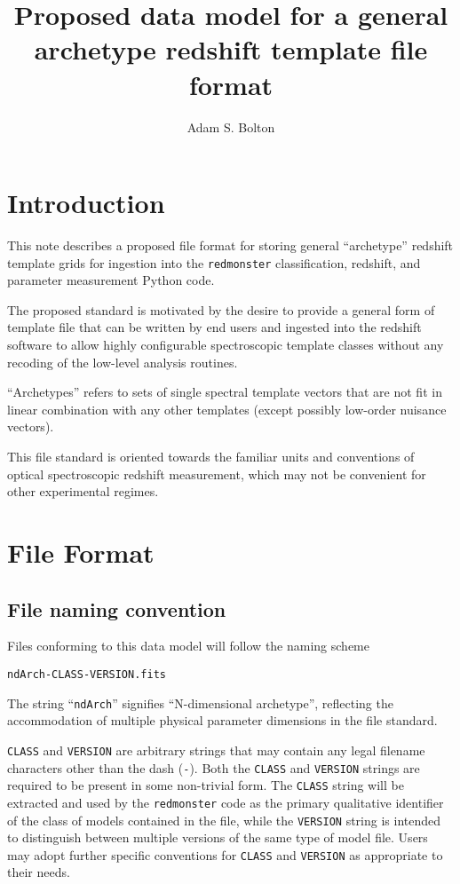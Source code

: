 \documentclass[12pt]{article}
\begin{document}
\title{Proposed data model for a general archetype
redshift template file format}

\author{Adam S. Bolton}

\maketitle

\section{Introduction}

This note describes a proposed file format for storing general
``archetype'' redshift template grids for ingestion into
the \texttt{redmonster} classification, redshift, and parameter
measurement Python code.

The proposed standard is motivated by the desire to provide a general
form of template file that can be written by end users and ingested
into the redshift software to allow highly configurable spectroscopic
template classes without any recoding of the low-level analysis routines.

``Archetypes'' refers to sets of single spectral template vectors that are not
fit in linear combination with any other templates (except possibly
low-order nuisance vectors).

This file standard is oriented towards the familiar units and conventions
of optical spectroscopic redshift measurement, which may not be convenient
for other experimental regimes.

\section{File Format}

\subsection{File naming convention}

Files conforming to this data model will follow the naming scheme

\hspace*{36pt}\texttt{ndArch-CLASS-VERSION.fits}

The string ``\texttt{ndArch}'' signifies ``N-dimensional archetype'',
reflecting the accommodation of multiple physical parameter dimensions
in the file standard.

\texttt{CLASS} and \texttt{VERSION} are arbitrary
strings that may contain any legal filename
characters other than the dash (\texttt{-}).  Both the \texttt{CLASS}
and \texttt{VERSION} strings are required to be present in
some non-trivial form.  The \texttt{CLASS} string will be extracted
and used by the \texttt{redmonster} code as the primary qualitative
identifier of the class of models contained in the file,
while the \texttt{VERSION} string is intended to distinguish
between multiple versions of the same type of model file.
Users may adopt further specific conventions for \texttt{CLASS}
and \texttt{VERSION} as appropriate to their needs.
\end{document}
